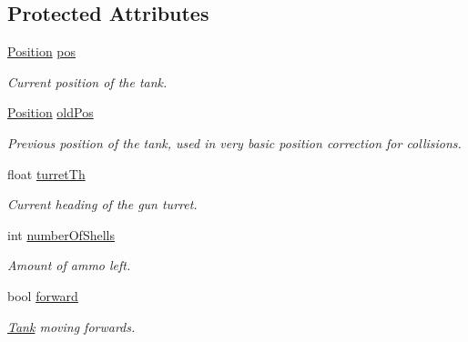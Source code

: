 \subsection*{Protected Attributes}
\begin{DoxyCompactItemize}
\item 
\mbox{\label{class_tank_ab74eb809bf4c7855b01796b2f1eec1b1}} 
\mbox{\hyperlink{class_position}{Position}} \mbox{\hyperlink{class_tank_ab74eb809bf4c7855b01796b2f1eec1b1}{pos}}
\begin{DoxyCompactList}\small\item\em Current position of the tank. \end{DoxyCompactList}\item 
\mbox{\label{class_tank_a786298cf02e081b0c8bc7598c8f6a68d}} 
\mbox{\hyperlink{class_position}{Position}} \mbox{\hyperlink{class_tank_a786298cf02e081b0c8bc7598c8f6a68d}{old\+Pos}}
\begin{DoxyCompactList}\small\item\em Previous position of the tank, used in very basic position correction for collisions. \end{DoxyCompactList}\item 
\mbox{\label{class_tank_ac0a54abd647f79b9087efccce9188014}} 
float \mbox{\hyperlink{class_tank_ac0a54abd647f79b9087efccce9188014}{turret\+Th}}
\begin{DoxyCompactList}\small\item\em Current heading of the gun turret. \end{DoxyCompactList}\item 
\mbox{\label{class_tank_ab1b1e42e323c8e52276857887cb624f0}} 
int \mbox{\hyperlink{class_tank_ab1b1e42e323c8e52276857887cb624f0}{number\+Of\+Shells}}
\begin{DoxyCompactList}\small\item\em Amount of ammo left. \end{DoxyCompactList}\item 
\mbox{\label{class_tank_a83bd2e7cd94cb7325f16e443a4a39d8e}} 
bool \mbox{\hyperlink{class_tank_a83bd2e7cd94cb7325f16e443a4a39d8e}{forward}}
\begin{DoxyCompactList}\small\item\em \mbox{\hyperlink{class_tank}{Tank}} moving forwards. \end{DoxyCompactList}\item 

\end{DoxyCompactItemize}
